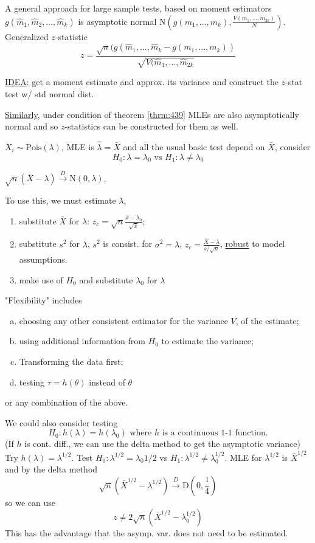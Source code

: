 \documentclass[english, 11pt]{article}
\newcommand{\lp}{\left(}
\newcommand{\rp}{\right)}
\begin{document}
\vspace{10 mm}

A general approach for large sample tests, based on moment estimators $g(\hat{m}_1, \hat{m}_2, \dots, \hat{m}_k)$ is asymptotic normal N$(g(m_1, \dots, m_k), \frac{V(m_1, \dots, m_{2k})}{N})$. Generalized $z$-statistic
$$
z=\frac{\sqrt{n}(g(\hat{m}_1, \dots, \hat{m}_k-g(m_1, \dots, m_k))}{\sqrt{V(\hat{m}_1, \dots, \hat{m}_{2k}}}
$$

\vspace{10 mm}

\underline{IDEA}: get a moment estimate and approx. its variance and construct the $z$-stat test w/ std normal dist.

\underline{Similarly}, under condition of theorem \ref{thrm:439} MLEs are also asymptotically normal and so $z$-statistics can be constructed for them as well.

\begin{exmp}
$X_i\sim \text{Pois}(\lambda)$, MLE is $\hat{\lambda}=\bar{X}$ and all the usual basic test depend on $\bar{X}$, consider
$$
H_0:\lambda=\lambda_0\text{ vs }H_1:\lambda\not=\lambda_0
$$

$\sqrt{n}(\bar{X}-\lambda)\xrightarrow{D}\text{N}(0, \lambda)$.

To use this, we must estimate $\lambda$,
\begin{enumerate}[1).]
\item substitute $\bar{X}$ for $\lambda$: $z_c=\sqrt{n}\frac{\bar{x}-\lambda_0}{\sqrt{\bar{x}}}$;
\item substitute $s^2$ for $\lambda$, $s^2$ is consist. for $\sigma^2=\lambda$, $z_c=\frac{\bar{X}-\lambda}{s/\sqrt{n}}$, \underline{robust} to model assumptions.
\item make use of $H_0$ and substitute $\lambda_0$ for $\lambda$
\end{enumerate}
"Flexibility" includes
\begin{enumerate}[a)]
\item choosing any other consistent estimator for the variance $V$, of the estimate;
\item using additional information from $H_0$ to estimate the variance;
\item Transforming the data first;
\item testing $\tau=h(\theta)$ instead of $\theta$
\end{enumerate}
or any combination of the above.
\end{exmp}

We could also consider testing 
$$
H_0:h(\lambda)=h(\lambda_0)\text{ where }h\text{ is a continuous 1-1 function.} 
$$
(If $h$ is cont. diff., we can use the delta method to get the asymptotic variance) Try $h(\lambda)=\lambda^{1/2}$. Test $H_0:\lambda^{1/2}=\lambda_0{1/2}$ vs $H_1:\lambda^{1/2}\not=\lambda_0^{1/2}$. MLE for $\lambda^{1/2}$ is $\bar{X}^{1/2}$ and by the delta method
$$
\sqrt{n}(\bar{X}^{1/2}-\lambda^{1/2})\xrightarrow{D}\text{D}\lp 0, \frac{1}{4}\rp
$$
so we can use
$$
z\not=2\sqrt{n}(\bar{X}^{1/2}-\lambda_0^{1/2})
$$
This has the advantage that the asymp. var. does not need to be estimated.
\end{document}
